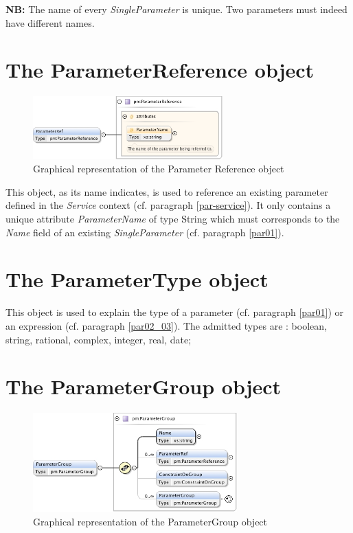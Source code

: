 \documentclass[a4paper,11pt] {article}
\begin{document}
{\bf NB:} The name of every {\it SingleParameter} is unique. Two parameters must indeed have
different names.

\section{The ParameterReference object}\label{par-parRef}

\begin{figure}[htbp]
\begin{center}
\includegraphics[width=0.65\textwidth]{pictures/ParameterRef.jpg} 
\caption{Graphical representation of the Parameter Reference object}
\label{Pic-ParameterRef}
\end{center}
\end{figure}

This object, as its name indicates, is used to reference an existing parameter defined in the {\it
Service} context (cf. paragraph
\ref{par-service}). It only contains a unique attribute {\it ParameterName} of type String which must corresponds to the {\it Name}
field of an existing {\it SingleParameter} (cf. paragraph \ref {par01}).

\section{The ParameterType object}\label{par-ParameterType}
This object is used to explain the type of a parameter (cf. paragraph \ref{par01}) or an expression
(cf. paragraph \ref{par02_03}). The admitted types are : boolean, string, rational, complex,
integer, real, date;

\section{The ParameterGroup object}\label{par-group}

\begin{figure}[htbp]
\begin{center}
\includegraphics[width=0.7\textwidth]{pictures/ParameterGroup.jpg} 
\caption{Graphical representation of the ParameterGroup object}
\label{Pic-ParameterGroup}
\end{center}
\end{figure}
\end{document}
